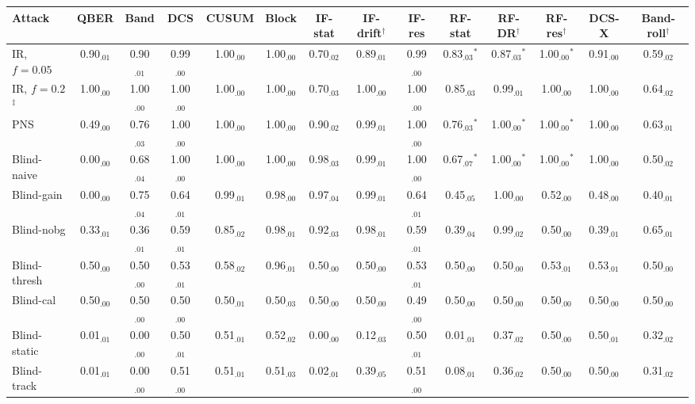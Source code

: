 \begin{tabular}{lccccccccccccc}
\hline
Attack & QBER & Band & DCS & CUSUM & Block & IF-stat & IF-drift$^\dagger$ & IF-res & RF-stat & RF-DR$^\dagger$ & RF-res$^\dagger$ & DCS-X & Band-roll$^\dagger$\\
\hline
IR, $f=0.05$ & 0.90$_{.01}$ & 0.90$_{.01}$ & 0.99$_{.00}$ & 1.00$_{.00}$ & 1.00$_{.00}$ & 0.70$_{.02}$ & 0.89$_{.01}$ & 0.99$_{.00}$ & 0.83$_{.03}$$^*$ & 0.87$_{.03}$$^*$ & 1.00$_{.00}$$^*$ & 0.91$_{.00}$ & 0.59$_{.02}$\\
IR, $f=0.2$$^\ddagger$ & 1.00$_{.00}$ & 1.00$_{.00}$ & 1.00$_{.00}$ & 1.00$_{.00}$ & 1.00$_{.00}$ & 0.70$_{.03}$ & 1.00$_{.00}$ & 1.00$_{.00}$ & 0.85$_{.03}$ & 0.99$_{.01}$ & 1.00$_{.00}$ & 1.00$_{.00}$ & 0.64$_{.02}$\\
PNS & 0.49$_{.00}$ & 0.76$_{.03}$ & 1.00$_{.00}$ & 1.00$_{.00}$ & 1.00$_{.00}$ & 0.90$_{.02}$ & 0.99$_{.01}$ & 1.00$_{.00}$ & 0.76$_{.03}$$^*$ & 1.00$_{.00}$$^*$ & 1.00$_{.00}$$^*$ & 1.00$_{.00}$ & 0.63$_{.01}$\\
Blind-naive & 0.00$_{.00}$ & 0.68$_{.04}$ & 1.00$_{.00}$ & 1.00$_{.00}$ & 1.00$_{.00}$ & 0.98$_{.03}$ & 0.99$_{.01}$ & 1.00$_{.00}$ & 0.67$_{.07}$$^*$ & 1.00$_{.00}$$^*$ & 1.00$_{.00}$$^*$ & 1.00$_{.00}$ & 0.50$_{.02}$\\
Blind-gain & 0.00$_{.00}$ & 0.75$_{.04}$ & 0.64$_{.01}$ & 0.99$_{.01}$ & 0.98$_{.00}$ & 0.97$_{.04}$ & 0.99$_{.01}$ & 0.64$_{.01}$ & 0.45$_{.05}$ & 1.00$_{.00}$ & 0.52$_{.00}$ & 0.48$_{.00}$ & 0.40$_{.01}$\\
Blind-nobg & 0.33$_{.01}$ & 0.36$_{.01}$ & 0.59$_{.01}$ & 0.85$_{.02}$ & 0.98$_{.01}$ & 0.92$_{.03}$ & 0.98$_{.01}$ & 0.59$_{.01}$ & 0.39$_{.04}$ & 0.99$_{.02}$ & 0.50$_{.00}$ & 0.39$_{.01}$ & 0.65$_{.01}$\\
Blind-thresh & 0.50$_{.00}$ & 0.50$_{.00}$ & 0.53$_{.01}$ & 0.58$_{.02}$ & 0.96$_{.01}$ & 0.50$_{.00}$ & 0.50$_{.00}$ & 0.53$_{.01}$ & 0.50$_{.00}$ & 0.50$_{.00}$ & 0.53$_{.01}$ & 0.53$_{.01}$ & 0.50$_{.00}$\\
Blind-cal & 0.50$_{.00}$ & 0.50$_{.00}$ & 0.50$_{.00}$ & 0.50$_{.01}$ & 0.50$_{.03}$ & 0.50$_{.00}$ & 0.50$_{.00}$ & 0.49$_{.00}$ & 0.50$_{.00}$ & 0.50$_{.00}$ & 0.50$_{.00}$ & 0.50$_{.00}$ & 0.50$_{.00}$\\
Blind-static & 0.01$_{.01}$ & 0.00$_{.00}$ & 0.50$_{.01}$ & 0.51$_{.01}$ & 0.52$_{.02}$ & 0.00$_{.00}$ & 0.12$_{.03}$ & 0.50$_{.01}$ & 0.01$_{.01}$ & 0.37$_{.02}$ & 0.50$_{.00}$ & 0.50$_{.01}$ & 0.32$_{.02}$\\
Blind-track & 0.01$_{.01}$ & 0.00$_{.00}$ & 0.51$_{.00}$ & 0.51$_{.01}$ & 0.51$_{.03}$ & 0.02$_{.01}$ & 0.39$_{.05}$ & 0.51$_{.00}$ & 0.08$_{.01}$ & 0.36$_{.02}$ & 0.50$_{.00}$ & 0.50$_{.00}$ & 0.31$_{.02}$\\

\end{tabular}
